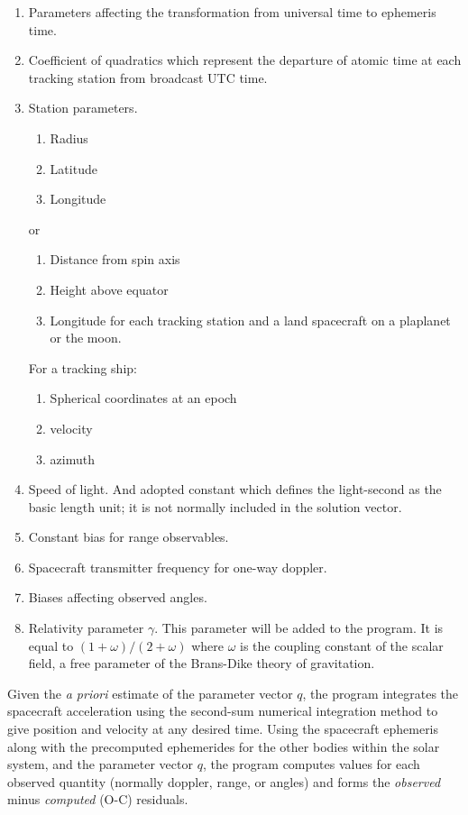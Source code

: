 \documentclass{article}
\begin{document}
\begin{multicols}{2}
\begin{enumerate}
    \item Parameters affecting the transformation from universal time to
      ephemeris time.
    \item Coefficient of quadratics which represent the departure of atomic
      time at each tracking station from broadcast UTC time.
    \item Station parameters.
      \begin{enumerate}
        \item Radius
        \item Latitude
        \item Longitude
      \end{enumerate}
      or
      \begin{enumerate}
        \item  Distance from spin axis
        \item Height above equator
        \item Longitude for each tracking station and a land spacecraft on a
          plaplanet or the moon.
      \end{enumerate}
      For a tracking ship:
      \begin{enumerate}
        \item Spherical coordinates at an epoch
        \item velocity
        \item azimuth
      \end{enumerate}
    \item Speed of light. And adopted constant which defines the light-second
      as the basic length unit; it is not normally included in the solution
      vector.
    \item Constant bias for range observables.
    \item Spacecraft transmitter frequency for one-way doppler.
    \item Biases affecting observed angles.
    \item Relativity parameter \(\gamma\). This parameter will be added to the
      program. It is equal to \((1+\omega)/(2+\omega)\) where \(\omega\) is the
      coupling constant of the scalar field, a free parameter of the Brans-Dike
      theory of gravitation.
  \end{enumerate}

  Given the \textit{a priori} estimate of the parameter vector \(q\), the program
  integrates the spacecraft acceleration using the second-sum numerical
  integration method to give position and velocity at any desired time. Using
  the spacecraft ephemeris along with the precomputed ephemerides for the other
  bodies within the solar system, and the parameter vector \(q\), the program
  computes values for each observed quantity (normally doppler, range, or
  angles) and forms the \textit{observed} minus \textit{computed} (O-C)
  residuals.


\end{multicols}
\end{document}
